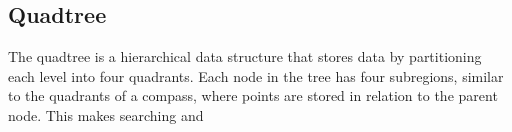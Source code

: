 \documentclass{CRPITStyle}
\begin{document}
\subsection{Quadtree}
The quadtree \citet{Samet:1984:QRH:356924.356930} is a hierarchical data structure that stores data by partitioning each level into four quadrants. Each node in the tree has four subregions, similar to the quadrants of a compass, where points are stored in relation to the parent node. This makes searching and 

  

\end{document}
